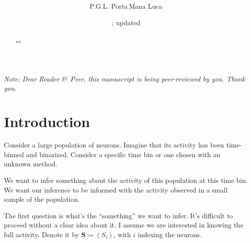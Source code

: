 \documentclass[\ifafour a4paper,12pt,\else a5paper,10pt,\fi%
onecolumn,oneside,article,%
british%
]{memoir}
\title{\propertitle%
}
\author{\ifpublic%
P.G.L. Porta\,Mana%
\else Luca\fi
\\
{\footnotesize\epost{\email{piero.mana}{ntnu.no}}%
}}
\date{\firstpublished; updated \updated}
\theoremstyle{remark}
\theoremstyle{innote}
\newcommand*{\amp}{\&}
\newcommand*{\asudedication}[1]{%
{\par\centering\textit{#1}\par}}
\newcommand*{\defd}{\coloneqq}
\renewcommand*{\|}{\mathpunct{|}}
\newcommand*{\ySS}{S}
\newcommand*{\yS}{\bm{\ySS}}
\begin{document}
\captiondelim{\quad}\captionnamefont{\footnotesize}\captiontitlefont{\footnotesize}
\frenchspacing

\maketitle
\ifpublic
\abstractrunin
\abslabeldelim{}
\renewcommand*{\abstractname}{}
\setlength{\absleftindent}{0pt}
\setlength{\absrightindent}{0pt}
\setlength{\abstitleskip}{-\absparindent}
\begin{abstract}%
  \noindent ***
\end{abstract}\fi

\frenchspacing


\noindent\emph{\footnotesize Note: Dear Reader \amp\ Peer, this manuscript is
  being peer-reviewed by \emph{you}. Thank you.}


\section{Introduction}
\label{sec:intro}

Consider a large population of neurons. Imagine that its activity has been
time-binned and binarized. Consider a specific time bin or one chosen with
an unknown method.

We want to infer something about the activity of this population at this
time bin. We want our inference to be informed with the activity observed
in a small sample of the population.

The first question is what's the \enquote{something} we want to infer. It's
difficult to proceed without a clear idea about it. I assume we are
interested in knowing the full activity. Denote it by $\yS \defd (\ySS_i)$,
with $i$ indexing the neurons.
\end{document}
